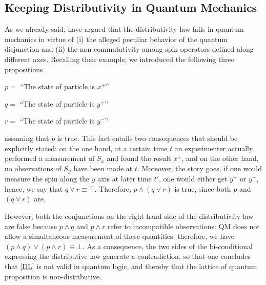 \documentclass[11pt, executivepaper]{article}
\begin{document}
\subsection{Keeping Distributivity in Quantum Mechanics}

As we already said, \cite{Giuntini:2002} have argued that the distributivity law fails in quantum mechanics in virtue of (i) the alleged peculiar behavior of the quantum disjunction and (ii) the non-commutativity among spin operators defined along different axes. Recalling their example, we introduced the following three propositions 

\begin{description}
    \item $p =$ ``The state of particle is $x^+$''
    \item $q =$ ``The state of particle is $y^+$''
    \item $r =$ ``The state of particle is $y^-$''
\end{description}

\noindent assuming that $p$ is true. This fact entails two consequences that should be explicitly stated: on the one hand, at a certain time $t$ an experimenter actually performed a measurement of $S_x$ and found the result $x^+$, and on the other hand, no observations of $S_y$ have been made at $t$. Moreover, the story goes, if one would measure the spin along the $y$ axis at later time $t'$, one would either get $y^+$ or $y^-$, hence, we say that $q \vee r \equiv \top$. Therefore, $p \wedge (q \vee r)$ is true, since both $p$ and $(q \vee r)$ are. 

However, both the conjunctions on the right hand side of the distributivity law are false because $p \wedge q$ and $ p \wedge r$ refer to incompatible observations: QM does not allow a simultaneous measurement of these quantities, therefore, we have $(p \wedge  q) \vee (p \wedge  r) \equiv \bot$. As a consequence, the two sides of the bi-conditional expressing the distributive law generate a contradiction, so that one concludes that \eqref{DL} is not valid in quantum logic, and thereby that the lattice of quantum proposition is non-distributive.
\end{document}
